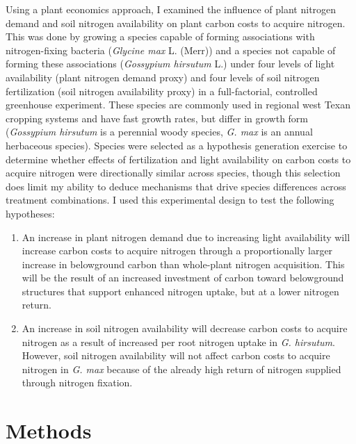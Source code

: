Using a plant economics approach, I examined the influence of plant nitrogen demand and soil nitrogen availability on plant carbon costs to acquire nitrogen. This was done by growing a species capable of forming associations with nitrogen-fixing bacteria (\textit{Glycine max} L. (Merr)) and a species not capable of forming these associations (\textit{Gossypium hirsutum} L.) under four levels of light availability (plant nitrogen demand proxy) and four levels of soil nitrogen fertilization (soil nitrogen availability proxy) in a full-factorial, controlled greenhouse experiment. These species are commonly used in regional west Texan cropping systems and have fast growth rates, but differ in growth form (\textit{Gossypium hirsutum} is a perennial woody species, \textit{G. max} is an annual herbaceous species). Species were selected as a hypothesis generation exercise to determine whether effects of fertilization and light availability on carbon costs to acquire nitrogen were directionally similar across species, though this selection does limit my ability to deduce mechanisms that drive species differences across treatment combinations. I used this experimental design to test the following hypotheses:
\begin{enumerate}
\item An increase in plant nitrogen demand due to increasing light availability will increase carbon costs to acquire nitrogen through a proportionally larger increase in belowground carbon than whole-plant nitrogen acquisition. This will be the result of an increased investment of carbon toward belowground structures that support enhanced nitrogen uptake, but at a lower nitrogen return. 

\item An increase in soil nitrogen availability will decrease carbon costs to acquire nitrogen as a result of increased per root nitrogen uptake in \textit{G. hirsutum}. However, soil nitrogen availability will not affect carbon costs to acquire nitrogen in \textit{G. max} because of the already high return of nitrogen supplied through nitrogen fixation.
\end{enumerate}

\section{Methods}
